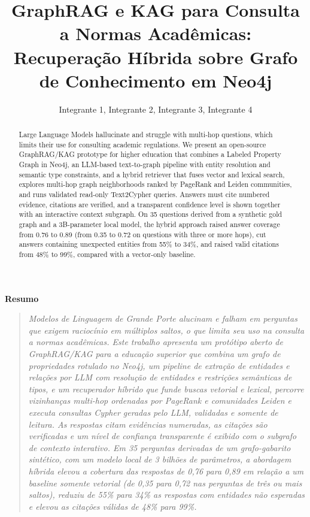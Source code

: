 \documentclass[12pt]{article}
\title{GraphRAG e KAG para Consulta a Normas Acadêmicas:\\
Recuperação Híbrida sobre Grafo de Conhecimento em Neo4j}
\author{Integrante 1\inst{1}, Integrante 2\inst{1}, Integrante 3\inst{1}, Integrante 4\inst{1}}
\makeatletter
\newenvironment{resumo}{\begin{center}\small\bfseries Resumo\end{center}\begin{quote}\small\itshape}{\end{quote}}%
\renewcommand{\maketitle}{\begin{center}{\Large\bfseries\@title\par}\vspace{1em}{\@author\par}\vspace{0.5em}{\small\@address\par}\end{center}\vspace{1em}}%
\makeatother
\begin{document}
\maketitle

\begin{abstract}
Large Language Models hallucinate and struggle with multi-hop questions, which limits
their use for consulting academic regulations. We present an open-source GraphRAG/KAG
prototype for higher education that combines a Labeled Property Graph in Neo4j, an
LLM-based text-to-graph pipeline with entity resolution and semantic type constraints,
and a hybrid retriever that fuses vector and lexical search, explores multi-hop graph
neighborhoods ranked by PageRank and Leiden communities, and runs validated read-only
Text2Cypher queries. Answers must cite numbered evidence, citations are verified, and a
transparent confidence level is shown together with an interactive context subgraph.
On 35 questions derived from a synthetic gold graph and a 3B-parameter local model, the
hybrid approach raised answer coverage from 0.76 to 0.89 (from 0.35 to 0.72 on questions
with three or more hops), cut answers containing unexpected entities from 55\% to 34\%,
and raised valid citations from 48\% to 99\%, compared with a vector-only baseline.
\end{abstract}

\begin{resumo}
Modelos de Linguagem de Grande Porte alucinam e falham em perguntas que exigem
raciocínio em múltiplos saltos, o que limita seu uso na consulta a normas acadêmicas.
Este trabalho apresenta um protótipo aberto de GraphRAG/KAG para a educação superior que
combina um grafo de propriedades rotulado no Neo4j, um pipeline de extração de
entidades e relações por LLM com resolução de entidades e restrições semânticas de
tipos, e um recuperador híbrido que funde buscas vetorial e lexical, percorre vizinhanças
multi-hop ordenadas por PageRank e comunidades Leiden e executa consultas Cypher geradas
pelo LLM, validadas e somente de leitura. As respostas citam evidências numeradas, as
citações são verificadas e um nível de confiança transparente é exibido com o subgrafo
de contexto interativo. Em 35 perguntas derivadas de um grafo-gabarito sintético, com um
modelo local de 3 bilhões de parâmetros, a abordagem híbrida elevou a cobertura das
respostas de 0,76 para 0,89 em relação a um baseline somente vetorial (de 0,35 para 0,72
nas perguntas de três ou mais saltos), reduziu de 55\% para 34\% as respostas com
entidades não esperadas e elevou as citações válidas de 48\% para 99\%.
\end{resumo}
\end{document}
